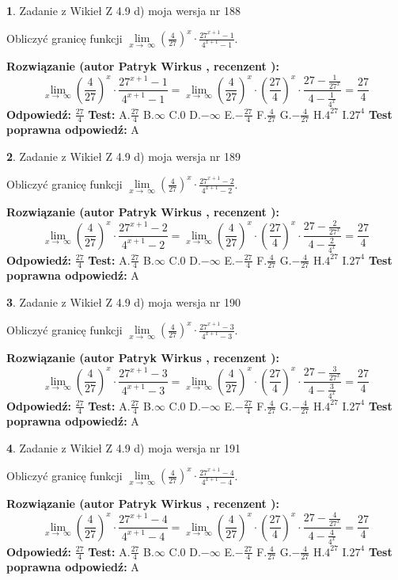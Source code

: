 \documentclass[12pt, a4paper]{article}
\theoremstyle{definition} %
\newtheorem{zad}{}
\newcommand{\zadStart}[1]{\begin{zad}#1\newline}
\newcommand{\zadStop}{\end{zad}}
\newcommand{\rozwStart}[2]{\noindent \textbf{Rozwiązanie (autor #1 , recenzent #2): }\newline}
\newcommand{\rozwStop}{\newline}
\newcommand{\odpStart}{\noindent \textbf{Odpowiedź:}\newline}
\newcommand{\odpStop}{\newline}
\newcommand{\testStart}{\noindent \textbf{Test:}\newline}
\newcommand{\testStop}{\newline}
\newcommand{\kluczStart}{\noindent \textbf{Test poprawna odpowiedź:}\newline}
\newcommand{\kluczStop}{\newline}
\begin{document}
\zadStart{Zadanie z Wikieł Z 4.9 d) moja wersja nr 188}


Obliczyć granicę funkcji  $\lim\limits_{x\to\ \infty}(\frac{4}{27})^{x}\cdot\frac{27^{x+1}-1}{4^{x+1}-1}$.
\zadStop
\rozwStart{Patryk Wirkus}{}
$$\lim\limits_{x\to\ \infty}(\frac{4}{27})^{x}\cdot\frac{27^{x+1}-1}{4^{x+1}-1}=\lim\limits_{x\to\ \infty}(\frac{4}{27})^{x}\cdot(\frac{27}{4})^{x} \cdot \frac{27-\frac{1}{27^{x}}}{4-\frac{1}{4^{x}}} = \frac{27}{4}$$
\rozwStop
\odpStart
$\frac{27}{4}$
\odpStop
\testStart
A.$\frac{27}{4}$ B.$\infty$ C.$0$ D.$-\infty$ E.$-\frac{27}{4}$
F.$\frac{4}{27}$ G.$-\frac{4}{27}$
H.$4^{27}$
I.$27^{4}$
\testStop
\kluczStart
A
\kluczStop



\zadStart{Zadanie z Wikieł Z 4.9 d) moja wersja nr 189}


Obliczyć granicę funkcji  $\lim\limits_{x\to\ \infty}(\frac{4}{27})^{x}\cdot\frac{27^{x+1}-2}{4^{x+1}-2}$.
\zadStop
\rozwStart{Patryk Wirkus}{}
$$\lim\limits_{x\to\ \infty}(\frac{4}{27})^{x}\cdot\frac{27^{x+1}-2}{4^{x+1}-2}=\lim\limits_{x\to\ \infty}(\frac{4}{27})^{x}\cdot(\frac{27}{4})^{x} \cdot \frac{27-\frac{2}{27^{x}}}{4-\frac{2}{4^{x}}} = \frac{27}{4}$$
\rozwStop
\odpStart
$\frac{27}{4}$
\odpStop
\testStart
A.$\frac{27}{4}$ B.$\infty$ C.$0$ D.$-\infty$ E.$-\frac{27}{4}$
F.$\frac{4}{27}$ G.$-\frac{4}{27}$
H.$4^{27}$
I.$27^{4}$
\testStop
\kluczStart
A
\kluczStop



\zadStart{Zadanie z Wikieł Z 4.9 d) moja wersja nr 190}


Obliczyć granicę funkcji  $\lim\limits_{x\to\ \infty}(\frac{4}{27})^{x}\cdot\frac{27^{x+1}-3}{4^{x+1}-3}$.
\zadStop
\rozwStart{Patryk Wirkus}{}
$$\lim\limits_{x\to\ \infty}(\frac{4}{27})^{x}\cdot\frac{27^{x+1}-3}{4^{x+1}-3}=\lim\limits_{x\to\ \infty}(\frac{4}{27})^{x}\cdot(\frac{27}{4})^{x} \cdot \frac{27-\frac{3}{27^{x}}}{4-\frac{3}{4^{x}}} = \frac{27}{4}$$
\rozwStop
\odpStart
$\frac{27}{4}$
\odpStop
\testStart
A.$\frac{27}{4}$ B.$\infty$ C.$0$ D.$-\infty$ E.$-\frac{27}{4}$
F.$\frac{4}{27}$ G.$-\frac{4}{27}$
H.$4^{27}$
I.$27^{4}$
\testStop
\kluczStart
A
\kluczStop



\zadStart{Zadanie z Wikieł Z 4.9 d) moja wersja nr 191}


Obliczyć granicę funkcji  $\lim\limits_{x\to\ \infty}(\frac{4}{27})^{x}\cdot\frac{27^{x+1}-4}{4^{x+1}-4}$.
\zadStop
\rozwStart{Patryk Wirkus}{}
$$\lim\limits_{x\to\ \infty}(\frac{4}{27})^{x}\cdot\frac{27^{x+1}-4}{4^{x+1}-4}=\lim\limits_{x\to\ \infty}(\frac{4}{27})^{x}\cdot(\frac{27}{4})^{x} \cdot \frac{27-\frac{4}{27^{x}}}{4-\frac{4}{4^{x}}} = \frac{27}{4}$$
\rozwStop
\odpStart
$\frac{27}{4}$
\odpStop
\testStart
A.$\frac{27}{4}$ B.$\infty$ C.$0$ D.$-\infty$ E.$-\frac{27}{4}$
F.$\frac{4}{27}$ G.$-\frac{4}{27}$
H.$4^{27}$
I.$27^{4}$
\testStop
\kluczStart
A
\kluczStop
\end{document}
